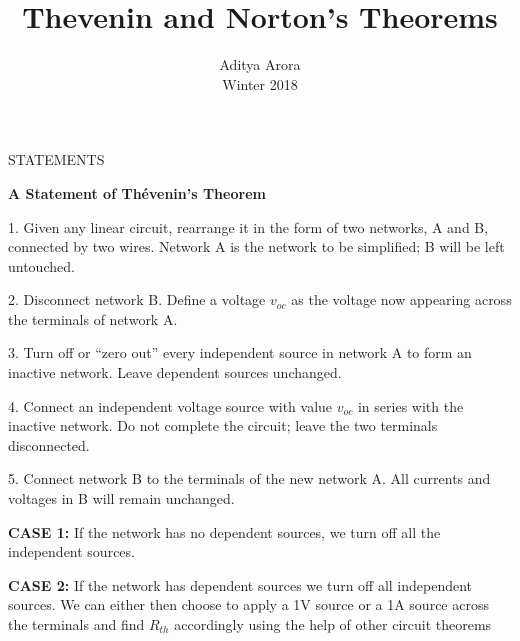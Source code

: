 \documentclass[12pt]{article}
\begin{document}
 
 
\title{Thevenin and Norton's Theorems}%
\author{Aditya Arora\\ %
Winter 2018} %
 
\maketitle

\begin{center}
   STATEMENTS
\end{center}
\vskip 0.1in
\textbf{A Statement of Thévenin’s Theorem}
\begin{trivlist}
\item1. Given any linear circuit, rearrange it in the form of two networks, A and B, connected by two wires. Network A is the network to be simplified; B will be left untouched.
\item2. Disconnect network B. Define a voltage $v_{oc}$ as the voltage now appearing across the terminals of network A.
\item3. Turn off or “zero out” every independent source in network A to form an inactive network. Leave dependent sources unchanged.
\item4. Connect an independent voltage source with value $v_{oc}$ in series with the inactive network. Do not complete the circuit; leave the two terminals disconnected.
\item5. Connect network B to the terminals of the new network A. All currents and voltages in B will remain unchanged.
\end{trivlist}
\vskip 0.1in
\begin{trivlist}
    \item \textbf{CASE 1:} If the network has no dependent sources, we turn off all the independent sources. 
    \item \textbf{CASE 2:} If the network has dependent sources we turn off all independent sources. We can either then choose to apply a 1V source or a 1A source across the terminals and find $R_{th}$ accordingly using the help of other circuit theorems
\end{trivlist}
\end{document}
